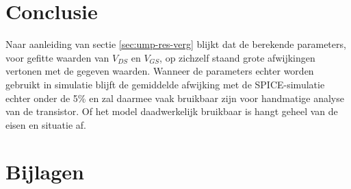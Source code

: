\documentclass{scrartcl}
\begin{document}
\section{Conclusie}
\label{sec:ump-conclusie}
Naar aanleiding van sectie \ref{sec:ump-res-verg} blijkt dat de berekende parameters, voor gefitte waarden van $V_{DS}$ en $V_{GS}$, op zichzelf staand grote afwijkingen vertonen met de gegeven waarden. Wanneer de parameters echter worden gebruikt in simulatie blijft de gemiddelde afwijking met de SPICE-simulatie echter onder de 5\% en zal daarmee vaak bruikbaar zijn voor handmatige analyse van de transistor. Of het model daadwerkelijk bruikbaar is hangt geheel van de eisen en situatie af.

\printbibliography

\section{Bijlagen}
\label{sec:ump-bijlagen}
\label{lst:ump-plotVdsId}
\label{lst:ump-plotVgsId}
\label{lst-ump-simulate}
\label{lst-ump-compare}
\end{document}
